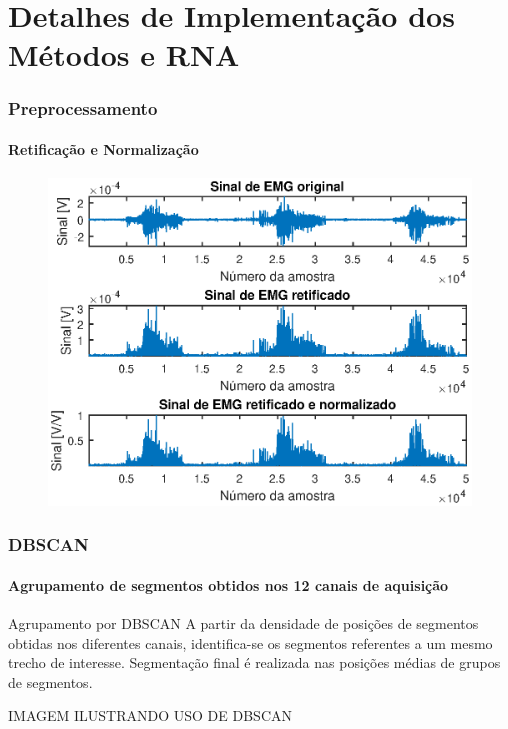 \documentclass{beamer}
\begin{document}
	\section[Implementação]{Detalhes de Implementação dos Métodos e RNA}
	
	\begin{frame}
		\frametitle{Preprocessamento}
		\framesubtitle{Retificação e Normalização}
		\begin{figure}
			\begin{center}
				\includegraphics[width=\textwidth]{./img/prettyRaw.eps}
			\end{center}
		\end{figure}
	\end{frame}
	
	\begin{frame}
		\frametitle{DBSCAN}
		\framesubtitle{Agrupamento de segmentos obtidos nos 12 canais de aquisição}
		\begin{exampleblock}{Agrupamento por DBSCAN}
			A partir da densidade de posições de segmentos obtidas nos diferentes canais, identifica-se os segmentos referentes a um mesmo trecho de interesse. Segmentação final é realizada nas posições médias de grupos de segmentos.
		\end{exampleblock}
		IMAGEM ILUSTRANDO USO DE DBSCAN
	\end{frame}
	
\end{document}
